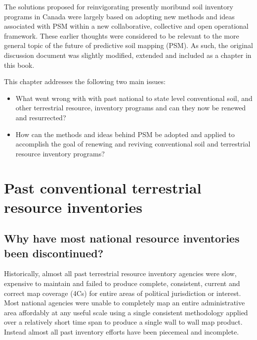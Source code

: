 \documentclass[graybox,natbib,nospthms,UStrade]{svmono}
\begin{document}
The solutions proposed for reinvigorating presently moribund soil
inventory programs in Canada were largely based on adopting new methods
and ideas associated with PSM within a new collaborative, collective and
open operational framework. These earlier thoughts were considered to be
relevant to the more general topic of the future of predictive soil
mapping (PSM). As such, the original discussion document was slightly
modified, extended and included as a chapter in this book.

This chapter addresses the following two main issues:

\begin{itemize}
\item
  What went wrong with with past national to state level conventional
  soil, and other terrestrial resource, inventory programs and can
  they now be renewed and resurrected?
\item
  How can the methods and ideas behind PSM be adopted and applied to
  accomplish the goal of renewing and reviving conventional soil and
  terrestrial resource inventory programs?
\end{itemize}

\hypertarget{past-conventional-terrestrial-resource-inventories}{%
\section{Past conventional terrestrial resource inventories}\label{past-conventional-terrestrial-resource-inventories}}

\hypertarget{why-have-most-national-resource-inventories-been-discontinued}{%
\subsection{Why have most national resource inventories been discontinued?}\label{why-have-most-national-resource-inventories-been-discontinued}}

Historically, almost all past terrestrial resource inventory agencies
were slow, expensive to maintain and failed to produce complete,
consistent, current and correct map coverage (4Cs) for entire areas of
political jurisdiction or interest. Most national agencies were unable
to completely map an entire administrative area affordably at any useful
scale using a single consistent methodology applied over a relatively
short time span to produce a single wall to wall map product. Instead
almost all past inventory efforts have been piecemeal and incomplete.
\end{document}
